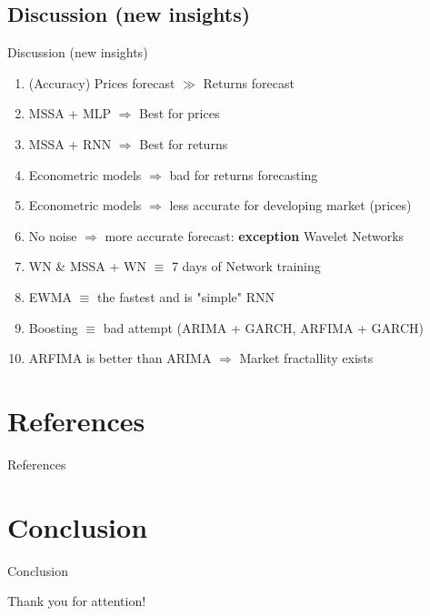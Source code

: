 \documentclass[11pt, aspectratio= 169]{beamer}
\begin{document}
	\subsection{Discussion (new insights)}
	\begin{frame}{Discussion (new insights)}
		\begin{enumerate}
			\item (Accuracy) Prices forecast $\gg$ Returns forecast
			\item MSSA + MLP $\Rightarrow$ Best for prices
			\item MSSA + RNN $\Rightarrow$ Best for returns
			\item Econometric models $\Rightarrow$ bad for returns forecasting
			\item Econometric models $\Rightarrow$ less accurate for developing market (prices)
			\item No noise $\Rightarrow$ more accurate forecast: \textbf{exception} Wavelet Networks
			\item WN \& MSSA + WN $\equiv$ 7 days of Network training
			\item EWMA $\equiv$ the fastest and is "simple" RNN
			\item Boosting $\equiv$ bad attempt (ARIMA + GARCH, ARFIMA + GARCH)
			\item ARFIMA is better than ARIMA $\Rightarrow$ Market fractallity exists \cite{mandelbrot2006misbehavior}
		\end{enumerate}
	\end{frame}
	
	\section{References}
	\begin{frame}{References}
		
		
	\end{frame}
	
	\section{Conclusion}
	\begin{frame}{Conclusion}
		\begin{center}
			\LARGE
			Thank you for attention!
		\end{center}
	\end{frame}
\end{document}
